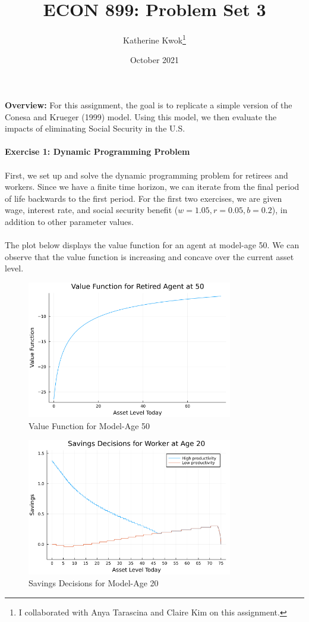 \documentclass[12pt]{article}
\title{ECON 899: Problem Set 3}
\author{Katherine Kwok\footnote{I collaborated with Anya Tarascina and Claire Kim on this assignment.}}
\date{October 2021}
\begin{document}
\maketitle
\noindent \textbf{Overview: } For this assignment, the goal is to replicate a simple version of the Conesa and Krueger (1999) model. Using this model, we then evaluate the impacts of eliminating Social Security in the U.S. \\\\
\noindent \textbf{Exercise 1: Dynamic Programming Problem} \\\\
First, we set up and solve the dynamic programming problem for retirees and workers. Since we have a finite time horizon, we can iterate from the final period of life backwards to the first period. For the first two exercises, we are given wage, interest rate, and social security benefit ($w = 1.05, r = 0.05, b = 0.2$), in addition to other parameter values. \\\\
The plot below displays the value function for an agent at model-age 50. We can observe that the value function is increasing and concave over the current asset level. 

\begin{figure}[!htbp]
    \centering
    \includegraphics[width = 0.8\textwidth]{age_50_value_func.png}
    \caption{Value Function for Model-Age 50}
    \label{fig:val_func_50}
\end{figure}

\begin{figure}[!htbp]
    \centering
    \includegraphics[width = 0.8\textwidth]{age_20_savings.png}
    \caption{Savings Decisions for Model-Age 20}
    \label{fig:savings_20}
\end{figure}
\end{document}
